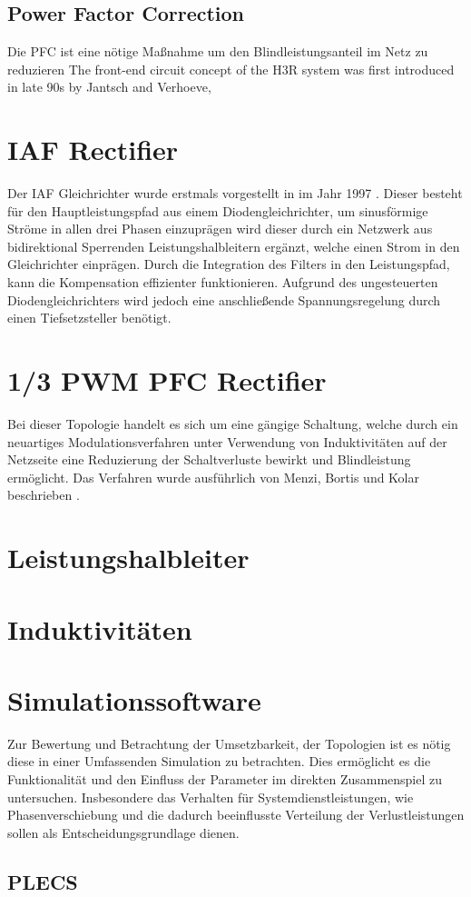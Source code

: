 \subsection{Power Factor Correction}
	Die \gls{PFC} ist eine nötige Maßnahme um den Blindleistungsanteil im Netz zu reduzieren 
	The front-end circuit concept of the H3R system was first introduced in late 90s by Jantsch and Verhoeve,
	
	
\section{IAF Rectifier}
Der \gls{IAF} Gleichrichter wurde erstmals vorgestellt in \cite{IAFfirst} im Jahr 1997 . Dieser besteht für den Hauptleistungspfad aus einem Diodengleichrichter, um sinusförmige Ströme in allen drei Phasen einzuprägen wird dieser durch ein Netzwerk aus bidirektional Sperrenden Leistungshalbleitern ergänzt, welche einen Strom in den Gleichrichter einprägen. Durch die Integration des Filters in den Leistungspfad, kann die Kompensation effizienter funktionieren. Aufgrund des ungesteuerten Diodengleichrichters wird jedoch eine anschließende Spannungsregelung durch einen Tiefsetzsteller benötigt.

\section{1/3 PWM PFC Rectifier}
Bei dieser Topologie handelt es sich um eine gängige Schaltung, welche durch ein neuartiges Modulationsverfahren unter Verwendung von Induktivitäten auf der Netzseite eine Reduzierung der Schaltverluste bewirkt und Blindleistung ermöglicht. Das Verfahren wurde ausführlich von Menzi, Bortis und Kolar beschrieben \cite{13PWMPFC}.



\section{Leistungshalbleiter}

\section{Induktivitäten}

\section{Simulationssoftware}
Zur Bewertung und Betrachtung der Umsetzbarkeit, der Topologien ist es nötig diese in einer Umfassenden Simulation zu betrachten. Dies ermöglicht es die Funktionalität und den Einfluss der Parameter im direkten Zusammenspiel zu untersuchen. Insbesondere das Verhalten für Systemdienstleistungen, wie Phasenverschiebung und die dadurch beeinflusste Verteilung der Verlustleistungen sollen als Entscheidungsgrundlage dienen. 

	\subsection{PLECS}